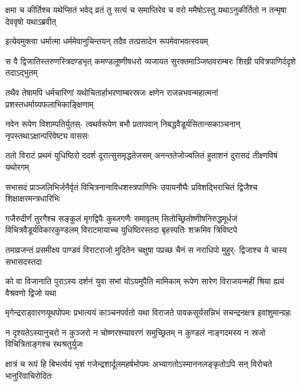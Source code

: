 \fourlineindentedshloka
{क्षमा च कीर्तिश्च यथेप्सितं भवेद्}
{व्रतं तु सत्यं च समाप्तिरेव च}
{वरो ममैषोऽस्तु यथाऽनुकीर्तितो}
{न तन्मृषा देववृषो यथाऽब्रवीत्}



\twolineshloka
{इत्येवमुक्त्वा धर्मात्मा धर्ममेवानुचिन्तयन्}
{तदैव तत्प्रसादेन रूपमेवाभवत्स्वयम्}


\fourlineindentedshloka
{स वै द्विजातिस्तरुणस्त्रिदण्डभृत्}
{कमण्डलूष्णीषधरो व्यजायत}
{सुरक्तमाञ्जिष्ठवराम्बरः शिखी}
{पवित्रपाणिर्ददृशे तदाऽद्भुतम्}


\fourlineindentedshloka
{तथैव तेषामपि धर्मचारिणां}
{यथोचितार्हाभरणाम्बरस्रजः}
{क्षणेन राजन्नभवन्महात्मनां}
{प्रशस्तधर्माग्र्यफलाभिकाङ्क्षिणाम्}


\fourlineindentedshloka
{नवेन रूपेण विशाम्पतिर्युतस्-}
{त्वथर्वरूपेण बभौ प्रतापवान्}
{निबद्धवैडूर्यसितान्सकाञ्चनान्}
{नृपस्तथाऽक्षान्परिवेष्ट्य वाससः}


\fourlineindentedshloka
{ततो विराटं प्रथमं युधिष्ठिरो}
{ददर्श दूरात्सुसमृद्धतेजसम्}
{अनन्ततेजोज्वलितं हुताशनं}
{दुरासदं तीक्ष्णविषं यथोरगम्}


\fourlineindentedshloka
{सभासदं प्राञ्जलिभिर्जनैर्वृतं}
{विचित्रनानाविधशस्त्रपाणिभिः}
{उपायनौघैः प्रविशद्भिराचितं}
{द्विजैश्च शिक्षाक्षरमन्त्रधारिभिः}



\sixlineindentedshloka
{गजैरुदीर्णं तुरगैश्च सङ्कुलं}
{मृगद्विपैः कुब्जगणैः समावृतम्}
{सितोच्छ्रितोष्णीषनिरुद्धमूर्धजं}
{विचित्रवैडूर्यविकारकुण्डलम्}
{विराटमायाच्च युधिष्ठिरस्तदा}
{बृहस्पतिः शक्रमिव त्रिविष्टपे}


\fourlineindentedshloka
{तमाव्रजन्तं प्रसमीक्ष्य पाण्डवं}
{विराटराजो मुदितेन चक्षुषा}
{पप्रच्छ चैनं स नराधिपो मुहुर्-}
{द्विजाश्च ये चास्य सभासदस्तदा}




\fourlineindentedshloka
{को वा विजानाति पुराऽस्य दर्शनं}
{युवा सभां योऽयमुपैति मामिकाम्}
{रूपेण सारेण विराजयन्महीं}
{श्रिया ह्ययं वैश्रवणो द्विजो यथा}


\fourlineindentedshloka
{मृगेन्द्रराड्वारणयूथपोपमः}
{प्रभात्ययं काञ्चनपर्वतो यथा}
{विराजते पावकसूर्यसन्निभं}
{सचन्द्रनक्षत्र इवांशुमान्ग्रहः}


\fourlineindentedshloka
{न दृश्यतेऽस्यानुचरो न कुञ्जरो}
{न चोष्णरश्म्यावरणं समुच्छ्रितम्}
{न कुण्डलं नाङ्गदमस्य न स्रजो}
{विचित्रिताङ्गश्च रथश्रतुर्युजः}


\fourlineindentedshloka
{क्षात्रं च रूपं हि बिभर्त्ययं भृशं}
{गजेन्द्रशार्दूलमहर्षभोपमः}
{अभ्यागतोऽस्माननलङ्कृतोऽपि सन्}
{विरोचते भानुरिवाचिरोदितः}


